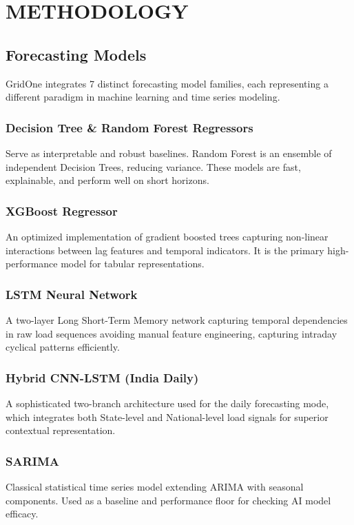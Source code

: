 \documentclass[ 12pt,a4paper,twocolumn,fleqn]{report}
\begin{document}
\newpage
  \pagestyle{fancy}
\thisfancypage{%
  \setlength{\fboxsep}{20pt}\doublebox}{}
\normalsize
\chapter{METHODOLOGY}
\section{Forecasting Models}
\vspace{2mm}
GridOne integrates 7 distinct forecasting model families, each representing a different paradigm in machine learning and time series modeling.

\subsection{Decision Tree \& Random Forest Regressors}
Serve as interpretable and robust baselines. Random Forest is an ensemble of independent Decision Trees, reducing variance. These models are fast, explainable, and perform well on short horizons.

\subsection{XGBoost Regressor}
An optimized implementation of gradient boosted trees capturing non-linear interactions between lag features and temporal indicators. It is the primary high-performance model for tabular representations.

\subsection{LSTM Neural Network}
A two-layer Long Short-Term Memory network capturing temporal dependencies in raw load sequences avoiding manual feature engineering, capturing intraday cyclical patterns efficiently.

\subsection{Hybrid CNN-LSTM (India Daily)}
A sophisticated two-branch architecture used for the daily forecasting mode, which integrates both State-level and National-level load signals for superior contextual representation.

\subsection{SARIMA}
Classical statistical time series model extending ARIMA with seasonal components. Used as a baseline and performance floor for checking AI model efficacy.
\end{document}
